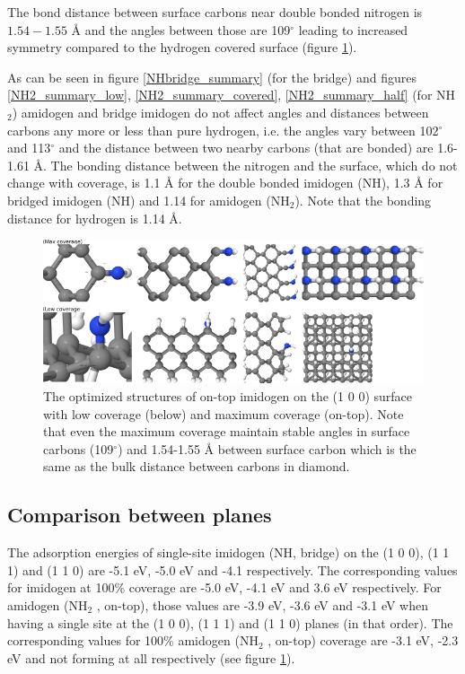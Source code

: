 \documentclass[12pt,a4paper]{article}
\begin{document}
The bond distance between surface carbons near double bonded nitrogen is $1.54-1.55$ Å and the angles between those are 109$^{\circ}$ leading to increased symmetry compared to the hydrogen covered surface (figure \ref{NHdb_summary}).

As can be seen in figure \ref{NHbridge_summary} (for the bridge) and figures \ref{NH2_summary_low},   \ref{NH2_summary_covered}, \ref{NH2_summary_half} (for NH$_2$) amidogen and bridge imidogen do not affect angles and distances between carbons  any more or less than pure hydrogen, i.e. the angles vary between 102$^{\circ}$ and 113$^{\circ}$ and the distance between two nearby carbons (that are bonded) are 1.6-1.61 Å.  The bonding distance between the nitrogen and the surface, which do not change with coverage, is 1.1 Å for the double bonded imidogen (NH), 1.3 Å for bridged imidogen (NH) and 1.14 for amidogen (NH$_2$). Note that the bonding distance for hydrogen is 1.14 Å.

\begin{figure} \captionsetup{width=.8\linewidth} \caption{The optimized structures of on-top imidogen on the (1 0 0) surface with low coverage (below) and maximum coverage (on-top). Note that even the maximum coverage maintain stable angles in surface carbons (109$^{\circ}$) and 1.54-1.55 Å between surface carbon which is the same as the bulk distance between carbons in diamond.} \label{NHdb_summary}
%
\includegraphics[width=.8\linewidth]{pictures/NHdb_summary.png}
\end{figure}



\subsection{Comparison between planes}
The adsorption energies of single-site imidogen (NH, bridge) on the (1 0 0), (1 1 1) and (1 1 0) are -5.1 eV, -5.0 eV and -4.1 respectively. The corresponding values for imidogen at 100\% coverage are -5.0 eV, -4.1 eV and 3.6 eV respectively. For amidogen (NH$_2$ , on-top), those values are -3.9 eV, -3.6 eV and -3.1 eV when having a single site at the (1 0 0), (1 1 1) and (1 1 0) planes (in that order). The corresponding values for 100\% amidogen (NH$_2$ , on-top) coverage are -3.1 eV, -2.3 eV and not forming at all respectively (see figure \ref{NHdb_summary}).
\end{document}
